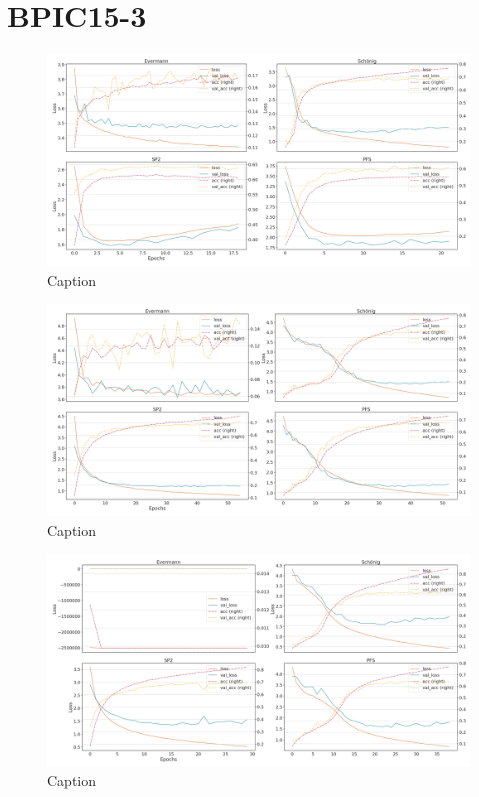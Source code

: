 \section{BPIC15-3}
\begin{figure}[!htb]
    \centering
    \includegraphics[width=\textwidth]{gfx/bpic2015_3/individual_loss_acc_curve.png}
    \caption{Caption}
    \label{fig:my_label}
\end{figure}
\begin{figure}[!htb]
    \centering
    \includegraphics[width=\textwidth]{gfx/bpic2015_3/grouped_loss_acc_curve.png}
    \caption{Caption}
    \label{fig:my_label}
\end{figure}
\begin{figure}[!htb]
    \centering
    \includegraphics[width=\textwidth]{gfx/bpic2015_3/padded_loss_acc_curve.png}
    \caption{Caption}
    \label{fig:my_label}
\end{figure}

